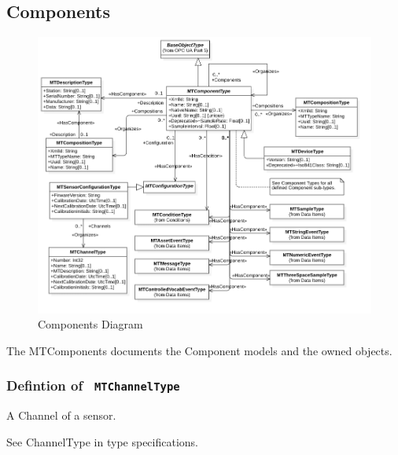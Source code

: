 \subsection{Components} \label{model:Components}

\begin{figure}[ht]
  \centering
    \includegraphics[width=1.0\textwidth]{./diagrams/types/Components.png}
  \caption{Components Diagram}
  \label{fig:Components}
\end{figure}

\FloatBarrier


The \glspl{MTComponent} documents the Component models and the owned objects.

\subsubsection{Defintion of \texttt{ MTChannelType}}
  \label{type:MTChannelType}

\FloatBarrier

A Channel of a sensor.

See ChannelType in type specifications.

